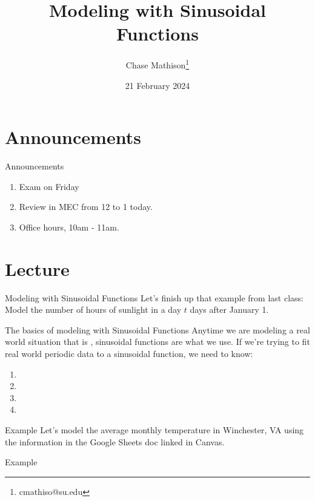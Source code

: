 \documentclass[presentation]{beamer}
\institute[SU]{Shenandoah University}
\author{Chase Mathison\thanks{cmathiso@su.edu}}
\date{21 February 2024}
\title{Modeling with Sinusoidal Functions}
\begin{document}
\maketitle

\section{Announcements}
\label{sec:org832d302}
\begin{frame}[label={sec:org3cb3df4}]{Announcements}
\begin{enumerate}
\item Exam on Friday
\item Review in MEC from 12 to 1 today.
\item Office hours, 10am - 11am.
\end{enumerate}
\end{frame}

\section{Lecture}
\label{sec:org441add0}
\begin{frame}[label={sec:orgc9d7715}]{Modeling with Sinusoidal Functions}
Let's finish up that example from last class: Model the number of
hours of sunlight in a day \(t\) days after January 1.
\vspace{10in}
\end{frame}

\begin{frame}[label={sec:org1932edf}]{The basics of modeling with Sinusoidal Functions}
Anytime we are modeling a real world situation that is
\uline{\hspace*{1in}}, sinusoidal functions are what we use.  If we're trying to fit real world periodic data to a sinusoidal function, we need to know:

\begin{enumerate}
\item 

\item 

\item 

\item 
\end{enumerate}
\end{frame}

\begin{frame}[label={sec:org3087975}]{Example}
Let's model the average monthly temperature in Winchester, VA using
the information in the Google Sheets doc linked in Canvas.

\vspace{10in}
\end{frame}

\begin{frame}[label={sec:orgf529c23}]{Example}
\end{frame}
\end{document}
